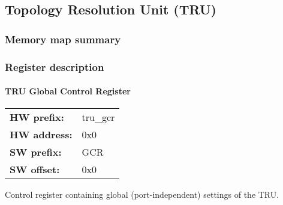 \subsection{Topology Resolution Unit (TRU)}
\label{subsec:wbgen:tru}

\subsubsection{Memory map summary}

\subsubsection{Register description}
\paragraph*{TRU Global Control Register}\vspace{12pt}

\begin{tabular}{l l }
{\bf HW prefix:}  & tru\_gcr\\
{\bf HW address:}  & 0x0\\
{\bf SW prefix:}  & GCR\\
{\bf SW offset:}  & 0x0\\
\end{tabular}

\vspace{12pt}
Control register containing global (port-independent) settings of the TRU.

